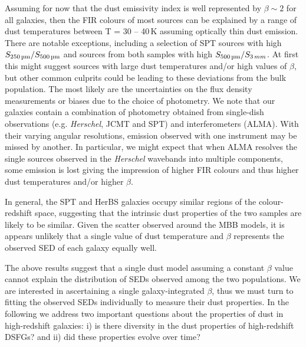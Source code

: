 Assuming for now that the dust emissivity index is well represented by $\beta \sim 2$ for all galaxies, then the FIR colours of most sources can be explained by a range of dust temperatures between T = 30 -- 40\,K assuming optically thin dust emission. There are notable exceptions, including a selection of SPT sources with high $S_{250\,\textrm{\micron}}/S_{500\,\textrm{\micron}}$  and sources from both samples with high $S_{500\,\textrm{\micron}}/S_{3\,mm}$. At first this might suggest sources with large dust temperatures and/or high values of $\beta$, but other common culprits could be leading to these deviations from the bulk population. The most likely are the uncertainties on the flux density measurements or biases due to the choice of photometry. We note that our galaxies contain a combination of photometry obtained from single-dish observations (e.g. \textit{Herschel}, JCMT and SPT) and interferometers (ALMA). With their varying angular resolutions, emission observed with one instrument may be missed by another. In particular, we might expect that when ALMA resolves the single sources observed in the \textit{Herschel} wavebands into multiple components, some emission is lost giving the impression of higher FIR colours and thus higher dust temperatures and/or higher $\beta$.

In general, the SPT and HerBS galaxies occupy similar regions of the colour-redshift space, suggesting that the intrinsic dust properties of the two samples are likely to be similar. Given the scatter observed around the MBB models, it is appears unlikely that a single value of dust temperature and $\beta$ represents the observed SED of each galaxy equally well.  

The above results suggest that a single dust model assuming a constant $\beta$ value cannot explain the distribution of SEDs observed among the two populations. We are interested in ascertaining a single galaxy-integrated $\beta$, thus we must turn to fitting the observed SEDs individually to measure their dust properties. In the following we address two important questions about the properties of dust in high-redshift galaxies: i) is there diversity in the dust properties of high-redshift DSFGs? and ii) did these properties evolve over time? 

